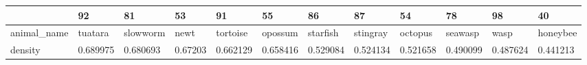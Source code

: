 \begin{tabular}{llllllllllll}
\toprule
{} &        92 &        81 &       53 &        91 &        55 &        86 &        87 &        54 &        78 &        98 &        40 \\
\midrule
animal\_name &   tuatara &  slowworm &     newt &  tortoise &   opossum &  starfish &  stingray &   octopus &   seawasp &      wasp &  honeybee \\
density     &  0.689975 &  0.680693 &  0.67203 &  0.662129 &  0.658416 &  0.529084 &  0.524134 &  0.521658 &  0.490099 &  0.487624 &  0.441213 \\
\bottomrule
\end{tabular}
